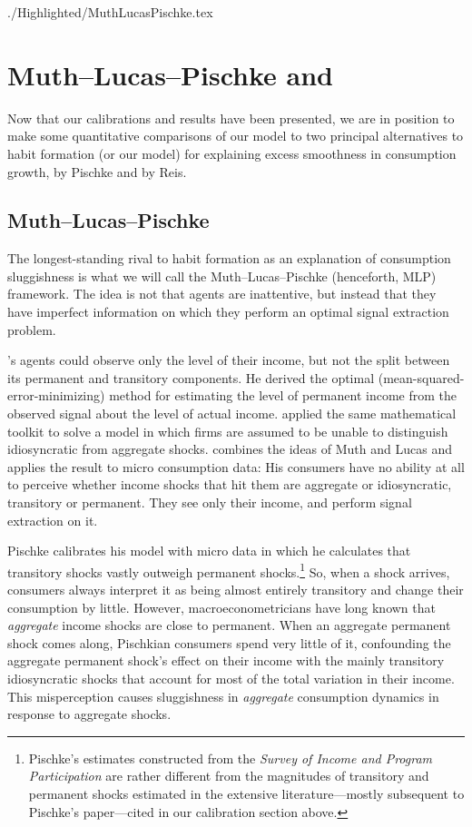 \hypertarget{MuthLucasPischke}{}
\begin{verbatimwrite}{./Highlighted/MuthLucasPischke.tex}
\section{Muth--Lucas--Pischke and \cite{reis:inattentive}} \label{sec:Comparisons}

Now that our calibrations and results have been presented, we are in position to make some quantitative comparisons of our model to two principal alternatives to habit formation (or our model) for explaining excess smoothness in consumption growth, by Pischke and by Reis.

\subsection{Muth--Lucas--Pischke}
The longest-standing rival to habit formation as an explanation of consumption sluggishness is what we will call the Muth--Lucas--Pischke (henceforth, MLP) framework.  The idea is not that agents are inattentive, but instead that they have imperfect information on which they perform an optimal signal extraction problem.

\cite{muthOptimal}'s agents could observe only the level of their income, but not the split between its permanent and transitory components.  He derived the optimal (mean-squared-error-minimizing) method for estimating the level of permanent income from the observed signal about the level of actual income.  \cite{lucas:imperfectInfo} applied the same mathematical toolkit to solve a model in which firms are assumed to be unable to distinguish idiosyncratic from aggregate shocks.  \cite{pischkeMicroMacro} combines the ideas of Muth and Lucas and applies the result to micro consumption data: His consumers have no ability at all to perceive whether income shocks that hit them are aggregate or idiosyncratic, transitory or permanent.  They see only their income, and perform signal extraction on it.

Pischke calibrates his model with micro data in which he calculates that transitory shocks vastly outweigh permanent shocks.\footnote{Pischke's estimates constructed from the {\it Survey of Income and Program Participation} are rather different from the magnitudes of transitory and permanent shocks estimated in the extensive literature---mostly subsequent to Pischke's paper---cited in our calibration section above.}  So, when a shock arrives, consumers always interpret it as being almost entirely transitory and change their consumption by little.  However, macroeconometricians have long known that {\it aggregate} income shocks are close to permanent.  When an aggregate permanent shock comes along, Pischkian consumers spend very little of it, confounding the aggregate permanent shock's effect on their income with the mainly transitory idiosyncratic shocks that account for most of the total variation in their income.  This misperception causes sluggishness in {\it aggregate} consumption dynamics in response to aggregate shocks.


\end{verbatimwrite}
